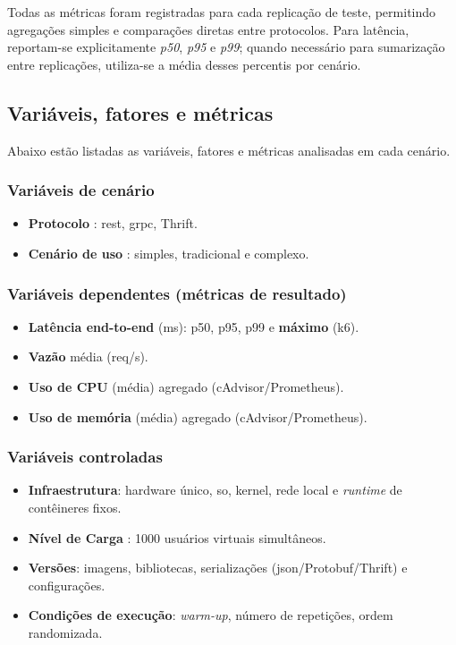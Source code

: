 Todas as métricas foram registradas para cada replicação de teste, permitindo agregações simples e comparações diretas entre protocolos. Para latência, reportam-se explicitamente \textit{p50}, \textit{p95} e \textit{p99}; quando necessário para sumarização entre replicações, utiliza-se a média desses percentis por cenário.

\subsection{Variáveis, fatores e métricas}
\label{sec:4-variaveis}

Abaixo estão listadas as variáveis, fatores e métricas analisadas em cada cenário.

\subsubsection*{Variáveis de cenário}
\begin{itemize}
\item \textbf{Protocolo} : {\gls{rest}, \gls{grpc}, Thrift}.
\item \textbf{Cenário de uso} : {simples, tradicional e complexo}.
\end{itemize}

\subsubsection*{Variáveis dependentes (métricas de resultado)}
\begin{itemize}
\item \textbf{Latência end-to-end} (ms): p50, p95, p99 e \textbf{máximo} (k6).
\item \textbf{Vazão} média (req/s).
\item \textbf{Uso de CPU} (média) agregado (cAdvisor/Prometheus).
\item \textbf{Uso de memória} (média) agregado (cAdvisor/Prometheus).
\end{itemize}

\subsubsection*{Variáveis controladas}
\begin{itemize}
\item \textbf{Infraestrutura}: hardware único, \acrshort{so}, kernel, rede local e \textit{runtime} de contêineres fixos.
\item \textbf{Nível de Carga} : {1000 usuários virtuais simultâneos}.
\item \textbf{Versões}: imagens, bibliotecas, serializações (\acrshort{json}/Protobuf/Thrift) e configurações.
\item \textbf{Condições de execução}: \textit{warm-up}, número de repetições, ordem randomizada.
\end{itemize}

